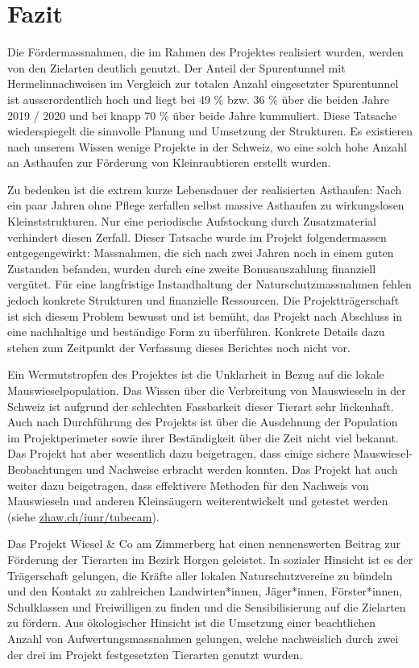 \documentclass[
  oneside]{scrbook}
\begin{document}
\hypertarget{fazit}{%
\section{Fazit}\label{fazit}}

Die Fördermassnahmen, die im Rahmen des Projektes realisiert wurden, werden von den Zielarten deutlich genutzt. Der Anteil der Spurentunnel mit Hermelinnachweisen im Vergleich zur totalen Anzahl eingesetzter Spurentunnel ist ausserordentlich hoch und liegt bei 49 \% bzw. 36 \% über die beiden Jahre 2019 / 2020 und bei knapp 70 \% über beide Jahre kummuliert. Diese Tatsache wiederspiegelt die sinnvolle Planung und Umsetzung der Strukturen. Es existieren nach unserem Wissen wenige Projekte in der Schweiz, wo eine solch hohe Anzahl an Asthaufen zur Förderung von Kleinraubtieren erstellt wurden.

Zu bedenken ist die extrem kurze Lebensdauer der realisierten Asthaufen: Nach ein paar Jahren ohne Pflege zerfallen selbst massive Asthaufen zu wirkungslosen Kleinststrukturen. Nur eine periodische Aufstockung durch Zusatzmaterial verhindert diesen Zerfall. Dieser Tatsache wurde im Projekt folgendermassen entgegengewirkt: Massnahmen, die sich nach zwei Jahren noch in einem guten Zustanden befanden, wurden durch eine zweite Bonusauszahlung finanziell vergütet. Für eine langfristige Instandhaltung der Naturschutzmassnahmen fehlen jedoch konkrete Strukturen und finanzielle Ressourcen. Die Projektträgerschaft ist sich diesem Problem bewusst und ist bemüht, das Projekt nach Abschluss in eine nachhaltige und beständige Form zu überführen. Konkrete Details dazu stehen zum Zeitpunkt der Verfassung dieses Berichtes noch nicht vor.

Ein Wermutstropfen des Projektes ist die Unklarheit in Bezug auf die lokale Mauswieselpopulation. Das Wissen über die Verbreitung von Mauswieseln in der Schweiz ist aufgrund der schlechten Fassbarkeit dieser Tierart sehr lückenhaft. Auch nach Durchführung des Projekts ist über die Ausdehnung der Population im Projektperimeter sowie ihrer Beständigkeit über die Zeit nicht viel bekannt. Das Projekt hat aber wesentlich dazu beigetragen, dass einige sichere Mauswiesel-Beobachtungen und Nachweise erbracht werden konnten. Das Projekt hat auch weiter dazu beigetragen, dass effektivere Methoden für den Nachweis von Mauswieseln und anderen Kleinsäugern weiterentwickelt und getestet werden (siehe \href{http://www.zhaw.ch/iunr/tubecam}{zhaw.ch/iunr/tubecam}).

Das Projekt Wiesel \& Co am Zimmerberg hat einen nennenswerten Beitrag zur Förderung der Tierarten im Bezirk Horgen geleistet. In sozialer Hinsicht ist es der Trägerschaft gelungen, die Kräfte aller lokalen Naturschutzvereine zu bündeln und den Kontakt zu zahlreichen Landwirten*innen, Jäger*innen, Förster*innen, Schulklassen und Freiwilligen zu finden und die Sensibilisierung auf die Zielarten zu fördern. Aus ökologischer Hinsicht ist die Umsetzung einer beachtlichen Anzahl von Aufwertungsmassnahmen gelungen, welche nachweislich durch zwei der drei im Projekt festgesetzten Tierarten genutzt wurden.
\end{document}
